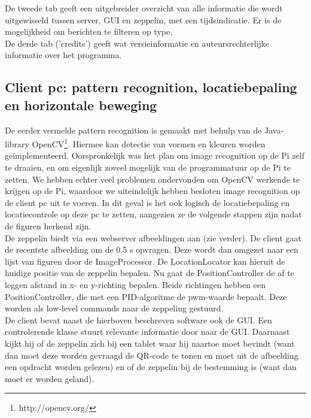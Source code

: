 \documentclass[eind]{penoverslag}
\begin{document}
De tweede tab geeft een uitgebreider overzicht van alle informatie die wordt uitgewisseld tussen server, GUI en zeppelin, met een tijdsindicatie. Er is de mogelijkheid om berichten te filteren op type. \\

De derde tab ('credits') geeft wat versieinformatie en auteursrechterlijke informatie over het programma.

\subsection{Client pc: pattern recognition, locatiebepaling en horizontale beweging}
De eerder vermelde pattern recognition is gemaakt met behulp van de Java-library OpenCV\footnote{http://opencv.org/}. Hiermee kan detectie van vormen en kleuren worden ge\"{i}mplementeerd. Oorspronkelijk was het plan om image recognition op de Pi zelf te draaien, en om eigenlijk zoveel mogelijk van de programmatuur op de Pi te zetten. We hebben echter veel problemen ondervonden om OpenCV werkende te krijgen op de Pi, waardoor we uiteindelijk hebben besloten image recognition op de client pc uit te voeren. In dit geval is het ook logisch de locatiebepaling en locatiecontrole op deze pc te zetten, aangezien ze de volgende stappen zijn nadat de figuren herkend zijn. \\

De zeppelin biedt via een webserver afbeeldingen aan (zie verder). De client gaat de recentste afbeelding om de 0.5 s opvragen. Deze wordt dan omgezet naar een lijst van figuren door de ImageProcessor. De LocationLocator kan hieruit de huidige positie van de zeppelin bepalen. Nu gaat de PositionController de af te leggen afstand in x- en y-richting bepalen. Beide richtingen hebben een PositionController, die met een PID-algoritme de pwm-waarde bepaalt. Deze worden als low-level commands naar de zeppeling gestuurd.\\

De client bevat naast de hierboven beschreven software ook de GUI. Een controlerende klasse stuurt relevante informatie door naar de GUI. Daarnaast kijkt hij of de zeppelin zich bij een tablet waar hij naartoe moet bevindt (want dan moet deze worden gevraagd de QR-code te tonen en moet uit de afbeelding een opdracht worden gelezen) en of de zeppelin bij de bestemming is (want dan moet er worden geland).
\end{document}
